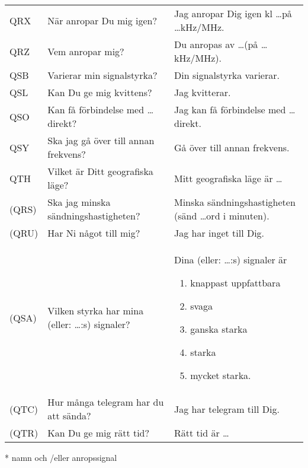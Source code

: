 \begin{table}
\begin{tabular}{lp{6cm}p{6cm}}
    \\
    QRX
    &
    När anropar Du mig igen?
    &
    Jag anropar Dig igen kl \dots på \dots kHz/MHz.
    \\
    QRZ
    &
    Vem anropar mig?
    &
    Du anropas av \dots * (på \dots kHz/MHz).
    \\
    QSB
    &
    Varierar min signalstyrka?
    &
    Din signalstyrka varierar.
    \\
    QSL
    &
    Kan Du ge mig kvittens?
    &
    Jag kvitterar.
    \\
    QSO
    &
    Kan få förbindelse med \dots * direkt?
    &
    Jag kan få förbindelse med \dots * direkt.
    \\
    QSY
    &
    Ska jag gå över till annan frekvens?
    &
    Gå över till annan frekvens.
    \\
    QTH
    &
    Vilket är Ditt geografiska läge?
    &
    Mitt geografiska läge är \dots
    \\
    (QRS)
    &
    Ska jag minska sändningshastigheten?
    &
    Minska sändningshastigheten
    (sänd \dots ord i minuten).
    \\
    (QRU)
    &
    Har Ni något till mig?
    &
    Jag har inget till Dig.
    \\
    (QSA)
    &
    Vilken styrka har mina
    (eller: \dots *:s) signaler?
    &
    Dina (eller: \dots *:s) signaler är
    \vspace{-\topsep}
    \begin{enumerate}[noitemsep]
    	\item knappast uppfattbara
    	\item svaga
    	\item ganska starka
    	\item starka
    	\item mycket starka.
    \end{enumerate}
    \\
    (QTC)
    &
    Hur många telegram har du att sända?
    &
    Jag har telegram till Dig.
    \\
    (QTR)
    &
    Kan Du ge mig rätt tid?
    &
    Rätt tid är \dots
    \\
  \end{tabular}
* namn och /eller anropssignal
\end{table}

